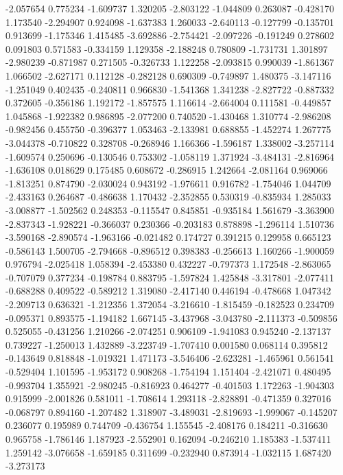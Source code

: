 -2.057654
0.775234
-1.609737
1.320205
-2.803122
-1.044809
0.263087
-0.428170
1.173540
-2.294907
0.924098
-1.637383
1.260033
-2.640113
-0.127799
-0.135701
0.913699
-1.175346
1.415485
-3.692886
-2.754421
-2.097226
-0.191249
0.278602
0.091803
0.571583
-0.334159
1.129358
-2.188248
0.780809
-1.731731
1.301897
-2.980239
-0.871987
0.271505
-0.326733
1.122258
-2.093815
0.990039
-1.861367
1.066502
-2.627171
0.112128
-0.282128
0.690309
-0.749897
1.480375
-3.147116
-1.251049
0.402435
-0.240811
0.966830
-1.541368
1.341238
-2.827722
-0.887332
0.372605
-0.356186
1.192172
-1.857575
1.116614
-2.664004
0.111581
-0.449857
1.045868
-1.922382
0.986895
-2.077200
0.740520
-1.430468
1.310774
-2.986208
-0.982456
0.455750
-0.396377
1.053463
-2.133981
0.688855
-1.452274
1.267775
-3.044378
-0.710822
0.328708
-0.268946
1.166366
-1.596187
1.338002
-3.257114
-1.609574
0.250696
-0.130546
0.753302
-1.058119
1.371924
-3.484131
-2.816964
-1.636108
0.018629
0.175485
0.608672
-0.286915
1.242664
-2.081164
0.969066
-1.813251
0.874790
-2.030024
0.943192
-1.976611
0.916782
-1.754046
1.044709
-2.433163
0.264687
-0.486638
1.170432
-2.352855
0.530319
-0.835934
1.285033
-3.008877
-1.502562
0.248353
-0.115547
0.845851
-0.935184
1.561679
-3.363900
-2.837343
-1.928221
-0.366037
0.230366
-0.203183
0.878898
-1.296114
1.510736
-3.590168
-2.890574
-1.963166
-0.021482
0.174727
0.391215
0.129958
0.665123
-0.586143
1.500705
-2.794668
-0.896512
0.398383
-0.256613
1.160266
-1.900059
0.976794
-2.025418
1.058394
-2.453380
0.432227
-0.797373
1.172548
-2.863065
-0.707079
0.377234
-0.198784
0.883795
-1.597824
1.425848
-3.317801
-2.077411
-0.688288
0.409522
-0.589212
1.319080
-2.417140
0.446194
-0.478668
1.047342
-2.209713
0.636321
-1.212356
1.372054
-3.216610
-1.815459
-0.182523
0.234709
-0.095371
0.893575
-1.194182
1.667145
-3.437968
-3.043780
-2.111373
-0.509856
0.525055
-0.431256
1.210266
-2.074251
0.906109
-1.941083
0.945240
-2.137137
0.739227
-1.250013
1.432889
-3.223749
-1.707410
0.001580
0.068114
0.395812
-0.143649
0.818848
-1.019321
1.471173
-3.546406
-2.623281
-1.465961
0.561541
-0.529404
1.101595
-1.953172
0.908268
-1.754194
1.151404
-2.421071
0.480495
-0.993704
1.355921
-2.980245
-0.816923
0.464277
-0.401503
1.172263
-1.904303
0.915999
-2.001826
0.581011
-1.708614
1.293118
-2.828891
-0.471359
0.327016
-0.068797
0.894160
-1.207482
1.318907
-3.489031
-2.819693
-1.999067
-0.145207
0.236077
0.195989
0.744709
-0.436754
1.155545
-2.408176
0.184211
-0.316630
0.965758
-1.786146
1.187923
-2.552901
0.162094
-0.246210
1.185383
-1.537411
1.259142
-3.076658
-1.659185
0.311699
-0.232940
0.873914
-1.032115
1.687420
-3.273173
